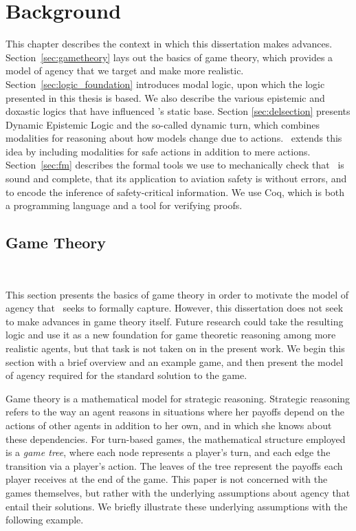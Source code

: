 \chapter{Background}
	\label{CH_02}

This chapter describes the context in which this dissertation makes advances. Section~\ref{sec:gametheory} lays out the basics of game theory, which provides a model of agency that we target and make more realistic. Section~\ref{sec:logic_foundation} introduces modal logic, upon which the logic presented in this thesis is based. We also describe the various epistemic and doxastic logics that have influenced \DASL's static base. Section \ref{sec:delsection} presents Dynamic Epistemic Logic and the so-called dynamic turn, which combines modalities for reasoning about how models change due to actions. \DASL\ extends this idea by including modalities for safe actions in addition to mere actions. Section~\ref{sec:fm} describes the formal tools we use to mechanically check that \DASL\ is sound and complete, that its application to aviation safety is without errors, and to encode the inference of safety-critical information. We use Coq, which is both a programming language and a tool for verifying proofs. 




\section{Game Theory}~\label{sec:gametheory}

This section presents the basics of game theory in order to motivate the model of agency that \DASL\ seeks to formally capture. However, this dissertation does not seek to make advances in game theory itself. Future research could take the resulting logic and use it as a new foundation for game theoretic reasoning among more realistic agents, but that task is not taken on in the present work. We begin this section with a brief overview and an example game, and then present the model of agency required for the standard solution to the game.

Game theory is a mathematical model for strategic reasoning. Strategic reasoning refers to the way an agent reasons in situations where her payoffs depend on the actions of other agents in addition to her own, and in which she knows about these dependencies. For turn-based games, the mathematical structure employed is a \emph{game tree}, where each node represents a player's turn, and each edge the transition via a player's action. The leaves of the tree represent the payoffs each player receives at the end of the game. This paper is not concerned with the games themselves, but rather with the underlying assumptions about agency that entail their solutions. We briefly illustrate these underlying assumptions with the following example.


